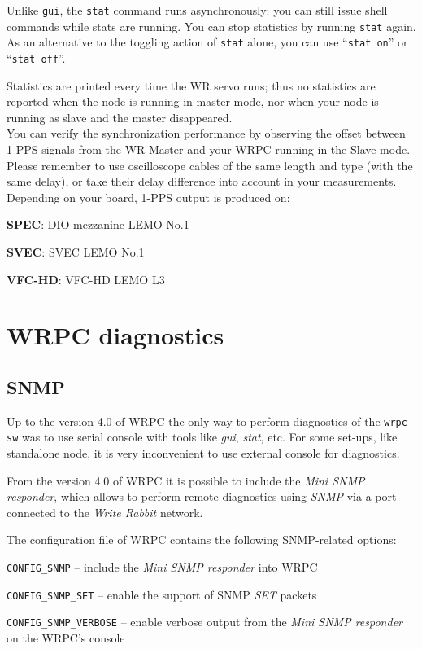 \documentclass[a4paper, 12pt]{article}
\begin{document}
\vspace{1em}
Unlike \texttt{gui}, the \texttt{stat} command runs asynchronously: you can still
issue shell commands while stats are running. You can stop statistics by running
\texttt{stat} again. As an alternative to the toggling action of \texttt{stat}
alone, you can use ``\texttt{stat on}'' or ``\texttt{stat off}''.

Statistics are printed every time the WR servo runs; thus no statistics
are reported when the node is running in master mode, nor when your node
is running as slave and the master disappeared.\\

You can verify the synchronization performance by observing the offset between
1-PPS signals from the WR Master and your WRPC running in the Slave mode. Please
remember to use oscilloscope cables of the same length and type (with the same
delay), or take their delay difference into account in your measurements.
Depending on your board, 1-PPS output is produced on:
\begin{itemize*}
  \item \textbf{SPEC}: DIO mezzanine LEMO No.1
  \item \textbf{SVEC}: SVEC LEMO No.1
  \item \textbf{VFC-HD}: VFC-HD LEMO L3
\end{itemize*}

\newpage
\section{WRPC diagnostics}
\subsection{SNMP}
\label{Diagnostics via SNMP}

Up to the version 4.0 of WRPC the only way to perform diagnostics
of the \texttt{wrpc-sw} was to use serial console with tools like \textit{gui}, \textit{stat},
etc. For some set-ups, like standalone node, it is very inconvenient to use
external console for diagnostics.

From the version 4.0 of WRPC it is possible to include the \textit{Mini
SNMP responder}, which allows to perform remote diagnostics using \textit{SNMP} via
a port connected to the \textit{Write Rabbit} network.

The configuration file of WRPC contains the following
SNMP-related options:
\begin{itemize*}
\item \texttt{CONFIG\_SNMP} -- include the \textit{Mini SNMP responder} into WRPC
\item \texttt{CONFIG\_SNMP\_SET} -- enable the support of SNMP \textit{SET} packets
\item \texttt{CONFIG\_SNMP\_VERBOSE} -- enable verbose output from the \textit{Mini SNMP
      responder} on the WRPC's console
\end{itemize*}
\end{document}
